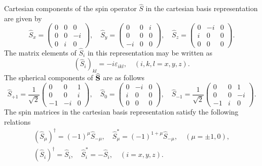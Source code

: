 Cartesian components of the spin operator $\widehat{S}$ in the cartesian basis representation are given by
\begin{equation}
\widehat{S}_{x}=\begin{pmatrix}
0 & 0 & 0  \label{eq:2:6:23}\\
0 & 0 & -i \\
0 & i & 0
\end{pmatrix}, \quad \widehat{S}_{y}=\begin{pmatrix}
0 & 0 & i \\
0 & 0 & 0 \\
-i & 0 & 0
\end{pmatrix}, \quad \widehat{S}_{z}=\begin{pmatrix}
0 & -i & 0 \\
i & 0 & 0 \\
0 & 0 & 0
\end{pmatrix} .
\end{equation}
The matrix elements of $\widehat{S}_{i}$ in this representation may be written as
\begin{equation}
\left(\widehat{S}_{i}\right)_{k l}=-i \varepsilon_{i k l}, \quad(i, k, l=x, y, z) . \label{eq:2:6:24}
\end{equation}
The spherical components of $\widehat{\mathbf{S}}$ are as follows
\begin{equation}
\widehat{S}_{+1}=\frac{1}{\sqrt{2}}\begin{pmatrix}
0 & 0 & 1  \label{eq:2:6:25}\\
0 & 0 & i \\
-1 & -i & 0
\end{pmatrix}, \quad \widehat{S}_{0}=\begin{pmatrix}
0 & -i & 0 \\
i & 0 & 0 \\
0 & 0 & 0
\end{pmatrix}, \quad \widehat{S}_{-1}=\frac{1}{\sqrt{2}}\begin{pmatrix}
0 & 0 & 1 \\
0 & 0 & -i \\
-1 & i & 0
\end{pmatrix} .
\end{equation}
The spin matrices in the cartesian basis representation satisfy the following relations
\begin{align}
\left(\widehat{S}_{\mu}\right)^{\dagger}=(-1)^{\mu} \widehat{S}_{-\mu}, \quad \widehat{S}_{\mu}^{*}=(-1)^{1+\mu} \widehat{S}_{-\mu}, \quad(\mu= \pm 1,0) , \label{eq:2:6:26}\\
\left(\widehat{S}_{i}\right)^{\dagger}=\widehat{S}_{i}, \quad \widehat{S}_{i}^{*}=-\widehat{S}_{i}, \quad(i=x, y, z) . \label{eq:2:6:27}
\end{align}
